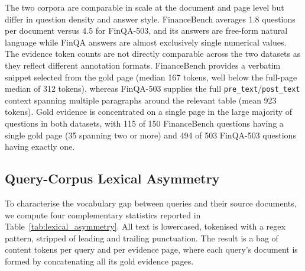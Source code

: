 \documentclass[12pt,twoside,maitrise]{dms}
\theoremstyle{definition}
\numberwithin{equation}{section}
\numberwithin{table}{chapter}
\numberwithin{figure}{chapter}
\begin{document}
The two corpora are comparable in scale at the document and page level but differ
in question density and answer style. FinanceBench averages 1.8 questions per document
versus 4.5 for FinQA-503, and its answers are free-form natural language while FinQA answers are almost exclusively single numerical values. The evidence token counts are not directly comparable across the two datasets
as they reflect different annotation formats. FinanceBench provides a verbatim snippet selected from the gold page (median 167 tokens, well below the full-page
median of 312 tokens), whereas FinQA-503 supplies the full
\texttt{pre\_text}/\texttt{post\_text} context spanning multiple paragraphs around the
relevant table (mean 923 tokens). Gold evidence is concentrated on a single page in
the large majority of questions in both datasets, with 115 of 150 FinanceBench
questions having a single gold page (35 spanning two or more) and 494 of 503 FinQA-503
questions having exactly one.

\subsection{Query-Corpus Lexical Asymmetry}
\label{sec:lexical_asymmetry}

To characterise the vocabulary gap between queries and their source documents, we
compute four complementary statistics reported in Table~\ref{tab:lexical_asymmetry}.
All text is lowercased, tokenised with a regex pattern, stripped of leading and
trailing punctuation. The result is a bag of content tokens per query and per evidence page,
where each query's document is formed by concatenating all its gold evidence pages.
\end{document}
